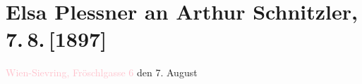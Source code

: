 

\renewcommand{\erwaehntePersonen}{Personen: Hermann Bahr, Elsa Plessner}
\renewcommand{\erwaehnteInstitutionen}{Institutionen: Die Zeit. Wiener Wochenschrift, Leopold Weiss}
\renewcommand{\erwaehnteOrte}{Orte: Café Pucher, Café Scheidl, Fröschelgasse 6, Leipzig, Wien}
\renewcommand{\erwaehnteWerke}{Werke: Der gläserne Käfig. Eine Parabel, Der gläserne Käfig. Skizzen und Novellen, Die Zeit. Wiener Wochenschrift}
\section[Elsa Plessner an Arthur Schnitzler, 7. 8. {[}1897{]}]{Elsa Plessner an Arthur Schnitzler, 7. 8. {[}1897{]}}
\nopagebreak{}
\rehead{ }\normalsize\beginnumbering{}
\toendnotes[C]{\smallbreak\pagebreak[2]}
\toendnotes[C]{\smallbreak}
\pstart
           \textcolor{pink}{Wien-Sievring, Fröschlgasse 6}{}\ledrightnote{\textcolor{pink}{Fröschelgasse 6}} den
                            7. August\pend
           
